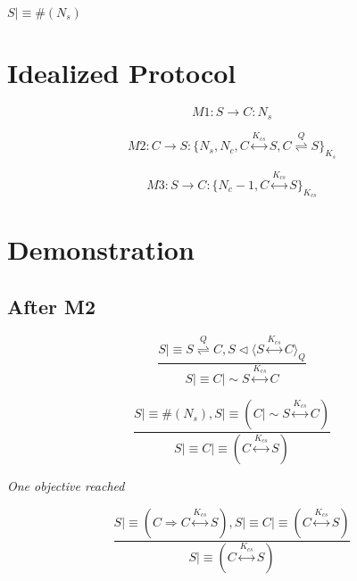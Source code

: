 \noindent
$
S \mid\equiv \#( N_{s} )
$

\section{Idealized Protocol}

\noindent
\begin{equation}
M1: S \rightarrow C:  N_{s}
\end{equation}


\noindent
\begin{equation}
M2: C \rightarrow S: \{ N_{s}, N_{c}, C \stackrel{ K_{cs} }\longleftrightarrow S, C \stackrel{ Q }\rightleftharpoons S  \}_{K_{s}}
\end{equation}
 
\begin{equation}
M3: S \rightarrow C: \{ N_{c} - 1, C \stackrel{ K_{cs} }\longleftrightarrow S \}_{K_{cs}}
\end{equation}

\section{Demonstration}

\subsection{After M2}
\begin{equation}
\frac{ 
	S \mid\equiv S \stackrel{ Q }\rightleftharpoons C, S \triangleleft  \langle S \stackrel {K_{cs}}\longleftrightarrow C \rangle_{ Q } 
 }
 {
	S \mid\equiv C \mid\sim S \stackrel {K_{cs}}\longleftrightarrow C
 }
\end{equation}

\begin{equation}
\frac{
	S \mid\equiv \#( N_{s} ), S \mid\equiv ( C \mid\sim S \stackrel {K_{cs}}\longleftrightarrow C )
}
{
 S \mid\equiv C \mid\equiv ( C \stackrel {K_{cs}}\longleftrightarrow S )
}
\end{equation}

\emph{One objective reached}

\begin{equation}
\frac{
	 S \mid\equiv (C \Rightarrow C \stackrel {K_{cs}}\longleftrightarrow S ), S \mid\equiv C \mid\equiv (C \stackrel {K_{cs}}\longleftrightarrow S)
}
{
	S \mid\equiv ( C \stackrel {K_{cs}}\longleftrightarrow S )
}
\end{equation}

